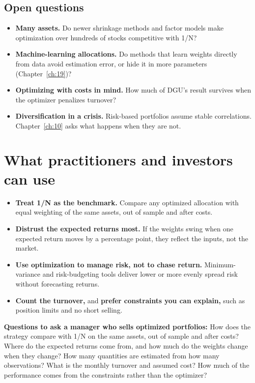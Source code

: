 \subsection{Open questions}
\label{sec:12-open}

\begin{itemize}
  \item \textbf{Many assets.} Do newer shrinkage methods and factor models make optimization over hundreds of stocks competitive with 1/N?
  \item \textbf{Machine-learning allocations.} Do methods that learn weights directly from data avoid estimation error, or hide it in more parameters (Chapter~\ref{ch:19})?
  \item \textbf{Optimizing with costs in mind.} How much of DGU's result survives when the optimizer penalizes turnover?
  \item \textbf{Diversification in a crisis.} Risk-based portfolios assume stable correlations. Chapter~\ref{ch:10} asks what happens when they are not.
\end{itemize}

\section{What practitioners and investors can use}
\label{sec:12-investors}

\begin{itemize}
  \item \textbf{Treat 1/N as the benchmark.} Compare any optimized allocation with equal weighting of the same assets, out of sample and after costs.
  \item \textbf{Distrust the expected returns most.} If the weights swing when one expected return moves by a percentage point, they reflect the inputs, not the market.
  \item \textbf{Use optimization to manage risk, not to chase return.} Minimum-variance and risk-budgeting tools deliver lower or more evenly spread risk without forecasting returns.
  \item \textbf{Count the turnover,} and \textbf{prefer constraints you can explain,} such as position limits and no short selling.
\end{itemize}

\textbf{Questions to ask a manager who sells optimized portfolios:} How does the strategy compare with 1/N on the same assets, out of sample and after costs? Where do the expected returns come from, and how much do the weights change when they change? How many quantities are estimated from how many observations? What is the monthly turnover and assumed cost? How much of the performance comes from the constraints rather than the optimizer?

